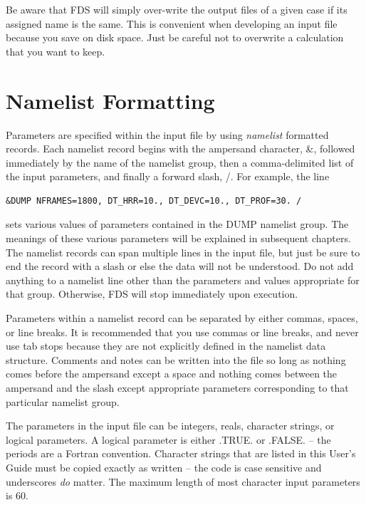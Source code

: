 \documentclass[11pt]{book}
\begin{document}
Be aware that FDS will simply over-write the output files of a given case if its assigned
name is the same. This is convenient when developing an input file because you save on disk space. Just be careful
not to overwrite a calculation that you want to keep.



\section{Namelist Formatting}

Parameters are specified within the input file by using {\em namelist} formatted records. Each namelist record begins with the ampersand character, {\ct \&}, followed immediately by the name of the namelist group, then a comma-delimited list of the input parameters, and finally a forward slash, {\ct /}. For example, the line
\begin{lstlisting}
&DUMP NFRAMES=1800, DT_HRR=10., DT_DEVC=10., DT_PROF=30. /
\end{lstlisting}
sets various values of parameters contained in the {\ct DUMP} namelist group. The meanings of these various parameters will be explained in subsequent chapters. The namelist records can span multiple lines in the input file, but just be sure to end the record with a slash or else the data will not be understood. Do not add anything to a namelist line other than the parameters and values appropriate for that group. Otherwise, FDS will stop immediately upon execution.

Parameters within a namelist record can be separated by either commas, spaces, or line breaks. It is recommended that you use commas or line breaks, and never use tab stops because they are not explicitly defined in the namelist data structure. Comments and notes can be written into the file so long as nothing comes before the ampersand except a space and nothing comes between the ampersand and the slash except appropriate parameters corresponding to that particular namelist group.

The parameters in the input file can be integers, reals, character strings, or logical parameters. A logical parameter is either {\ct .TRUE.} or {\ct .FALSE.} -- the periods are a Fortran convention. Character strings that are listed in this User's Guide must be copied exactly as written -- the code is case sensitive and underscores {\em do} matter. The maximum length of most character input parameters is 60.
\end{document}
